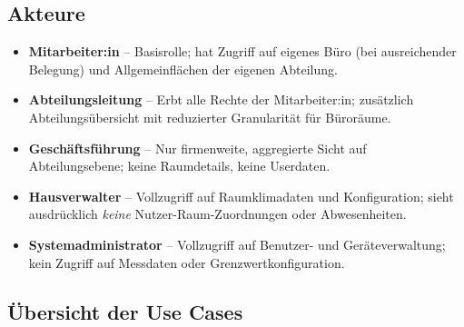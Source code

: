 \documentclass[12pt,a4paper]{article}
\begin{document}
\subsection{Akteure}
\begin{itemize}
	\item \textbf{Mitarbeiter:in} -- Basisrolle; hat Zugriff auf eigenes Büro (bei ausreichender Belegung) und Allgemeinflächen der eigenen Abteilung.
	\item \textbf{Abteilungsleitung} -- Erbt alle Rechte der Mitarbeiter:in; zusätzlich Abteilungsübersicht mit reduzierter Granularität für Büroräume.
	\item \textbf{Geschäftsführung} -- Nur firmenweite, aggregierte Sicht auf Abteilungsebene; keine Raumdetails, keine Userdaten.
	\item \textbf{Hausverwalter} -- Vollzugriff auf Raumklimadaten und Konfiguration; sieht ausdrücklich \emph{keine} Nutzer-Raum-Zuordnungen oder Abwesenheiten.
	\item \textbf{Systemadministrator} -- Vollzugriff auf Benutzer- und Geräteverwaltung; kein Zugriff auf Messdaten oder Grenzwertkonfiguration.
\end{itemize}

\subsection{Übersicht der Use Cases}
\end{document}
